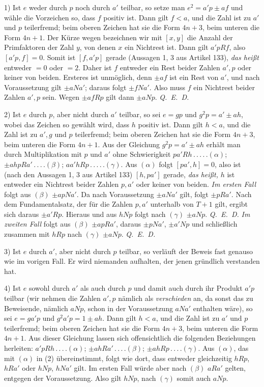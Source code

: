 1) Ist $e$ weder durch $p$ noch durch $a'$ teilbar, so setze man $e^2=a'p\pm af$ und wähle die Vorzeichen so, dass $f$ positiv ist. Dann gilt $f<a$, und die Zahl ist zu $a'$ und $p$ teilerfremd; beim oberen Zeichen hat sie die Form $4n+3$, beim unteren die Form $4n+1$. Der Kürze wegen bezeichnen wir mit $[x,y]$ die Anzahl der Primfaktoren der Zahl $y$, von denen $x$ ein Nichtrest ist. Dann gilt $a'pRf$, also $[a'p,f]=0$. Somit ist $[f,a'p]$ gerade (Aussagen 1, 3 aus Artikel 133), \textit{das heißt} entweder $=0$ oder $=2$. Daher ist $f$ entweder ein Rest beider Zahlen $a',p$ oder keiner von beiden. Ersteres ist unmöglich, denn $\pm af$ ist ein Rest von $a'$, und nach Voraussetzung gilt $\pm aNa'$; daraus folgt $\pm fNa'$. Also muss $f$ ein Nichtrest beider Zahlen $a',p$ sein. Wegen $\pm afRp$ gilt dann $\pm aNp$. \mbox{\textit{Q. E. D.}}

2) Ist $e$ durch $p$, aber nicht durch $a'$ teilbar, so sei $e=gp$ und $g^2p=a'\pm ah$, wobei das Zeichen so gewählt wird, dass $h$ positiv ist. Dann gilt $h<a$, und die Zahl ist zu $a',g$ und $p$ teilerfremd; beim oberen Zeichen hat sie die Form $4n+3$, beim unteren die Form $4n+1$. Aus der Gleichung $g^2p=a'\pm ah$ erhält man durch Multiplikation mit $p$ und $a'$ ohne Schwierigkeit $pa'Rh\,.\,.\,.\,.\,.(\alpha)$; $\pm ahpRa'\,.\,.\,.\,.(\beta)$; $aa'hRp\,.\,.\,.\,.\,.(\gamma)$. Aus $(\alpha)$ folgt $[pa',h]=0$, also ist (nach den Aussagen 1, 3 aus Artikel 133) $[h,pa']$ gerade, \textit{das heißt,} $h$ ist entweder ein Nichtrest beider Zahlen $p,a'$ oder keiner von beiden. \textit{Im ersten Fall} folgt aus $(\beta)$ $\pm apNa'$. Da nach Voraussetzung $\pm aNa'$ gilt, folgt $\pm pRa'$. Nach dem Fundamentalsatz, der für die Zahlen $p,a'$ unterhalb von $T+1$ gilt, ergibt sich daraus $\pm a'Rp$. Hieraus und aus $hNp$ folgt nach $(\gamma)$ $\pm aNp$. \mbox{\textit{Q. E. D.}} \textit{Im zweiten Fall} folgt aus $(\beta)$ $\pm apRa'$, daraus $\pm pNa'$, $\pm a'Np$ und schließlich zusammen mit $hRp$ nach $(\gamma)$ $\pm aNp$. \mbox{\textit{Q. E. D.}}

3) Ist $e$ durch $a'$, aber nicht durch $p$ teilbar, so verläuft der Beweis fast genauso wie im vorigen Fall. Er wird niemanden aufhalten, der jenen gründlich verstanden hat.

{ 4) Ist $e$ sowohl durch $a'$ als auch durch $p$ und damit auch durch ihr Produkt $a'p$ teilbar (wir nehmen die Zahlen $a',p$ nämlich als \textit{verschieden} an, da sonst das zu Beweisende, nämlich $aNp$, schon in der Voraussetzung $aNa'$ enthalten wäre), so sei $e=ga'p$ und $g^2a'p=1\pm ah$. Dann gilt $h<a$, und die Zahl ist zu $a'$ und $p$ teilerfremd; beim oberen Zeichen hat sie die Form $4n+3$, beim unteren die Form $4n+1$. Aus dieser Gleichung lassen sich offensichtlich die folgenden Beziehungen herleiten: $a'pRh\,.\,.\,.\,.(\alpha)$; $\pm ahRa'\,.\,.\,.\,.(\beta)$; $\pm ahRp\,.\,.\,.\,.(\gamma)$. Aus $(\alpha)$, das mit $(\alpha)$ in (2) übereinstimmt, folgt wie dort, dass entweder gleichzeitig $hRp$, $hRa'$ oder $hNp$, $hNa'$ gilt. Im ersten Fall würde aber nach $(\beta)$ $aRa'$ gelten, entgegen der Voraussetzung. Also gilt $hNp$, nach $(\gamma)$ somit auch $aNp$.\par}

